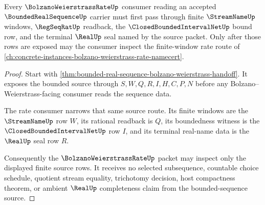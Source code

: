 \begin{theorem}
\label{thm:bounded-real-sequence-forward-bolzano-route}
Every $\BolzanoWeierstrassRateUp$ consumer reading an accepted $\BoundedRealSequenceUp$ carrier must first pass through finite $\StreamNameUp$ windows, $\RegSeqRatUp$ readback, the $\ClosedBoundedIntervalNetUp$ bound row, and the terminal $\RealUp$ seal named by the source packet. Only after those rows are exposed may the consumer inspect the finite-window rate route of \autoref{ch:concrete-instances-bolzano-weierstrass-rate-namecert}.
\end{theorem}
\begin{proof}
Start with \autoref{thm:bounded-real-sequence-bolzano-weierstrass-handoff}. It exposes the bounded source through $S,W,Q,R,I,H,C,P,N$ before any Bolzano--Weierstrass-facing consumer reads the sequence data.

The rate consumer narrows that same source route. Its finite windows are the $\StreamNameUp$ row $W$, its rational readback is $Q$, its boundedness witness is the $\ClosedBoundedIntervalNetUp$ row $I$, and its terminal real-name data is the $\RealUp$ seal row $R$.

Consequently the $\BolzanoWeierstrassRateUp$ packet may inspect only the displayed finite source rows. It receives no selected subsequence, countable choice schedule, quotient stream equality, trichotomy decision, host compactness theorem, or ambient $\RealUp$ completeness claim from the bounded-sequence source.
\end{proof}



